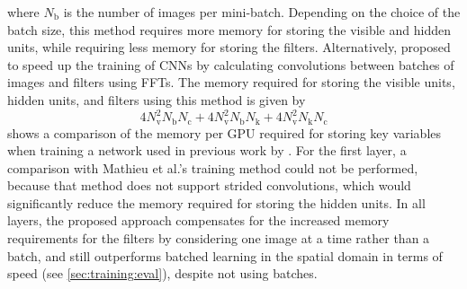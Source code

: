where $N_\text{b}$ is the number of images per mini-batch. Depending on the
choice of the batch size, this method requires more memory for storing the
visible and hidden units, while requiring less memory for storing the filters.
Alternatively, \citet{mathieu2013} proposed to speed up the training of CNNs by
calculating convolutions between batches of images and filters using FFTs. The
memory required for storing the visible units, hidden units, and filters using
this method is given by
\begin{equation}
4 N_\text{v}^2 N_\text{b}N_\text{c} + 4
N_\text{v}^2 N_\text{b}N_\text{k} + 4 N_\text{v}^2 N_\text{k}N_\text{c}
\end{equation}
 shows a comparison of the memory per GPU required for
storing key variables when training a network used in previous work by
\citet{krizhevsky2012}. For the first layer, a comparison with Mathieu et al.'s
training method could not be performed, because that method does not support
strided convolutions, which would significantly reduce the memory required for
storing the hidden units. In all layers, the proposed approach compensates for
the increased memory requirements for the filters by considering one image at a
time rather than a batch, and still outperforms batched learning in the spatial
domain in terms of speed (see \ref{sec:training:eval}), despite not using
batches.


